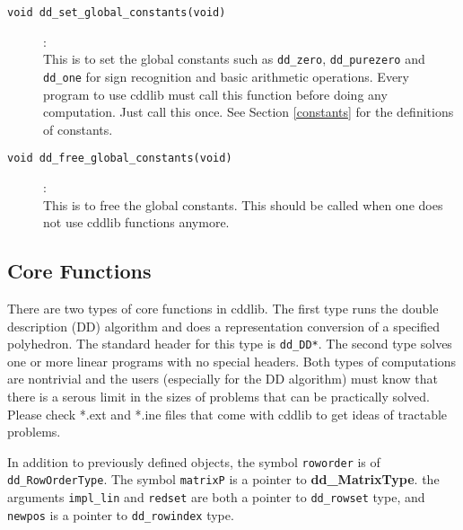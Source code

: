 \documentclass[11pt]{article}
\newcommand {\0} {{\bf 0}}
\begin{document}
\begin{description}

\item[{\tt void dd\_set\_global\_constants(void)}]:\\
This is to set the global constants such as {\tt dd\_zero},
{\tt dd\_purezero} and
{\tt dd\_one} for sign recognition and basic arithmetic
operations.  {Every program to use cddlib must call this function}
before doing any computation.    Just call this once.
 See Section \ref{constants} for the definitions of
constants.

\item[{\tt void dd\_free\_global\_constants(void)}]:\\
This is to free the global constants. This should be called
when one does not use cddlib functions anymore.
\end{description}

\subsection{Core Functions}  \label{CoreLibrary}

There are two types of core functions in cddlib.  The first type
runs the double description (DD) algorithm and does a representation
conversion of a specified polyhedron.  The standard header
for this type is {\tt dd\_DD*}.  The second type solves
one or more linear programs with no special headers.
Both types of computations are nontrivial
and the users (especially for the DD algorithm) must
know that there is a serous limit in the sizes of problems
that can be practically solved.
Please check *.ext and *.ine files that come with cddlib to get
ideas of tractable problems.

In addition to previously defined objects, the symbol  {\tt roworder} is
of {\tt dd\_RowOrderType}. The symbol {\tt matrixP} is
a pointer to {\bf dd\_MatrixType}.
the arguments {\tt impl\_lin} and {\tt redset} are both a pointer
to {\tt dd\_rowset} type, and {\tt newpos} is a pointer to
{\tt dd\_rowindex} type.
\end{document}
